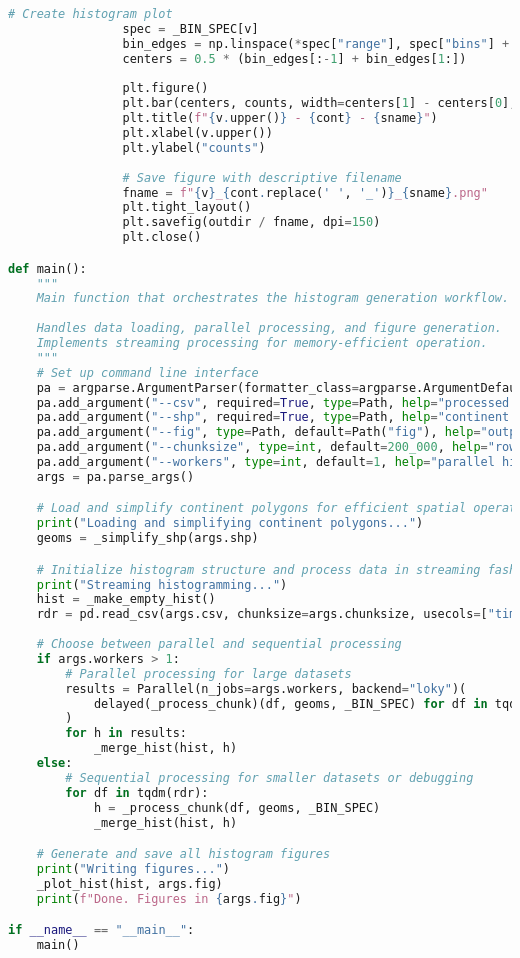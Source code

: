 \begin{lstlisting}[language=Python, caption=Histogram Generation Algorithm, label=alg:step03_histos]
                # Create histogram plot
                spec = _BIN_SPEC[v]
                bin_edges = np.linspace(*spec["range"], spec["bins"] + 1)
                centers = 0.5 * (bin_edges[:-1] + bin_edges[1:])
                
                plt.figure()
                plt.bar(centers, counts, width=centers[1] - centers[0], edgecolor="none")
                plt.title(f"{v.upper()} - {cont} - {sname}")
                plt.xlabel(v.upper())
                plt.ylabel("counts")
                
                # Save figure with descriptive filename
                fname = f"{v}_{cont.replace(' ', '_')}_{sname}.png"
                plt.tight_layout()
                plt.savefig(outdir / fname, dpi=150)
                plt.close()

def main():
    """
    Main function that orchestrates the histogram generation workflow.
    
    Handles data loading, parallel processing, and figure generation.
    Implements streaming processing for memory-efficient operation.
    """
    # Set up command line interface
    pa = argparse.ArgumentParser(formatter_class=argparse.ArgumentDefaultsHelpFormatter)
    pa.add_argument("--csv", required=True, type=Path, help="processed methane_all02.txt")
    pa.add_argument("--shp", required=True, type=Path, help="continent shapefile")
    pa.add_argument("--fig", type=Path, default=Path("fig"), help="output figure folder")
    pa.add_argument("--chunksize", type=int, default=200_000, help="rows per read chunk")
    pa.add_argument("--workers", type=int, default=1, help="parallel histogram workers")
    args = pa.parse_args()

    # Load and simplify continent polygons for efficient spatial operations
    print("Loading and simplifying continent polygons...")
    geoms = _simplify_shp(args.shp)

    # Initialize histogram structure and process data in streaming fashion
    print("Streaming histogramming...")
    hist = _make_empty_hist()
    rdr = pd.read_csv(args.csv, chunksize=args.chunksize, usecols=["times", "lon", "lat", "xch4", "xco"])
    
    # Choose between parallel and sequential processing
    if args.workers > 1:
        # Parallel processing for large datasets
        results = Parallel(n_jobs=args.workers, backend="loky")(
            delayed(_process_chunk)(df, geoms, _BIN_SPEC) for df in tqdm(rdr)
        )
        for h in results:
            _merge_hist(hist, h)
    else:
        # Sequential processing for smaller datasets or debugging
        for df in tqdm(rdr):
            h = _process_chunk(df, geoms, _BIN_SPEC)
            _merge_hist(hist, h)

    # Generate and save all histogram figures
    print("Writing figures...")
    _plot_hist(hist, args.fig)
    print(f"Done. Figures in {args.fig}")

if __name__ == "__main__":
    main()
\end{lstlisting}

